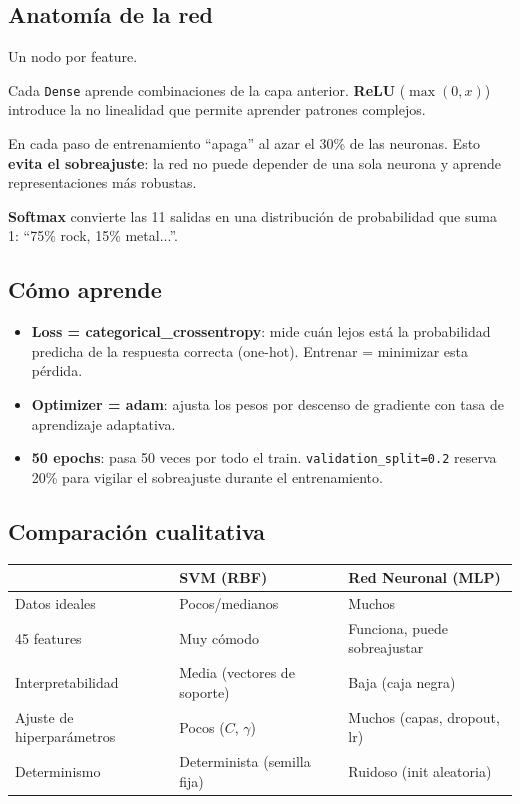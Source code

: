 \documentclass[11pt,a4paper]{article}
\begin{document}
\subsection{Anatomía de la red}

\begin{description}[leftmargin=0.5cm,style=nextline]
  \item[Capa de entrada (45)] Un nodo por feature.
  \item[Capas ocultas (128 $\rightarrow$ 64 $\rightarrow$ 32)] Cada
  \texttt{Dense} aprende combinaciones de la capa anterior. \textbf{ReLU}
  (\(\max(0,x)\)) introduce la no linealidad que permite aprender patrones
  complejos.
  \item[Dropout (0.3)] En cada paso de entrenamiento ``apaga'' al azar el 30\%
  de las neuronas. Esto \textbf{evita el sobreajuste}: la red no puede depender
  de una sola neurona y aprende representaciones más robustas.
  \item[Capa de salida (11, softmax)] \textbf{Softmax} convierte las 11 salidas
  en una distribución de probabilidad que suma 1: ``75\% rock, 15\% metal...''.
\end{description}

\subsection{Cómo aprende}

\begin{itemize}[leftmargin=0.7cm]
  \item \textbf{Loss = categorical\_crossentropy}: mide cuán lejos está la
  probabilidad predicha de la respuesta correcta (one-hot). Entrenar = minimizar
  esta pérdida.
  \item \textbf{Optimizer = adam}: ajusta los pesos por descenso de gradiente con
  tasa de aprendizaje adaptativa.
  \item \textbf{50 epochs}: pasa 50 veces por todo el train. \texttt{validation\_split=0.2}
  reserva 20\% para vigilar el sobreajuste durante el entrenamiento.
\end{itemize}

\subsection{Comparación cualitativa}

\begin{center}
\begin{tabular}{p{4cm} p{5cm} p{5cm}}
\toprule
 & \textbf{SVM (RBF)} & \textbf{Red Neuronal (MLP)} \\
\midrule
Datos ideales & Pocos/medianos & Muchos \\
45 features & Muy cómodo & Funciona, puede sobreajustar \\
Interpretabilidad & Media (vectores de soporte) & Baja (caja negra) \\
Ajuste de hiperparámetros & Pocos ($C$, $\gamma$) & Muchos (capas, dropout, lr) \\
Determinismo & Determinista (semilla fija) & Ruidoso (init aleatoria) \\
\bottomrule
\end{tabular}
\end{center}
\end{document}
